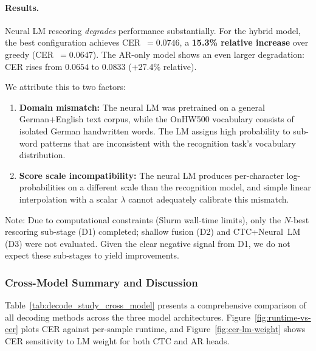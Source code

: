\paragraph{Results.}
Neural LM rescoring \emph{degrades} performance substantially.
For the hybrid model, the best configuration achieves CER~$=0.0746$,
a \textbf{15.3\% relative increase} over greedy (CER~$=0.0647$).
The AR-only model shows an even larger degradation: CER rises from $0.0654$ to $0.0833$ ($+$27.4\% relative).

We attribute this to two factors:
\begin{enumerate}[nosep]
    \item \textbf{Domain mismatch:} The neural LM was pretrained on a general German+English text corpus, while the OnHW500 vocabulary consists of isolated German handwritten words. The LM assigns high probability to sub-word patterns that are inconsistent with the recognition task's vocabulary distribution.
    \item \textbf{Score scale incompatibility:} The neural LM produces per-character log-probabilities on a different scale than the recognition model, and simple linear interpolation with a scalar $\lambda$ cannot adequately calibrate this mismatch.
\end{enumerate}

\noindent
Note: Due to computational constraints (Slurm wall-time limits), only the $N$-best rescoring sub-stage (D1) completed; shallow fusion (D2) and CTC+Neural~LM (D3) were not evaluated.
Given the clear negative signal from D1, we do not expect these sub-stages to yield improvements.


\subsubsection{Cross-Model Summary and Discussion}
\label{sec:decode-summary}

Table~\ref{tab:decode_study_cross_model} presents a comprehensive comparison of all decoding methods across the three model architectures.
Figure~\ref{fig:runtime-vs-cer} plots CER against per-sample runtime, and
Figure~\ref{fig:cer-lm-weight} shows CER sensitivity to LM weight for both CTC and AR heads.

